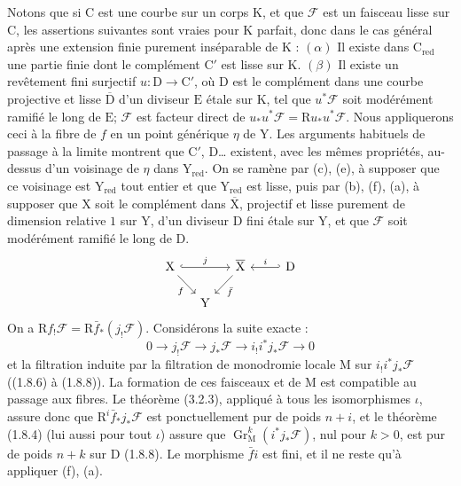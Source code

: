 \documentclass[11pt,leqno]{article}
\begin{document}
Notons que si \(\mathrm{C}\) est une courbe sur un corps \(\mathrm{K}\), et que \(\mathscr{F}\) est un faisceau lisse sur \(\mathrm{C}\), les assertions suivantes sont vraies pour \(\mathrm{K}\) parfait, donc dans le cas général après une extension finie purement inséparable de \(\mathrm{K}\) : \((\alpha)\) Il existe dans \(\mathrm{C}_{\mathrm{red}}\) une partie finie dont le complément \(\mathrm{C}'\) est lisse sur \(\mathrm{K}\). \((\beta)\) Il existe un revêtement fini surjectif \(u:\mathrm{D}\to\mathrm{C}'\), où \(\mathrm{D}\) est le complément dans une courbe projective et lisse \(\overline{\mathrm{D}}\) d’un diviseur \(\mathrm{E}\) étale sur \(\mathrm{K}\), tel que \(u^*\mathscr{F}\) soit modérément ramifié le long de \(\mathrm{E}\); \(\mathscr{F}\) est facteur direct de \(u_*u^*\mathscr{F}=\mathrm{R}u_*u^*\mathscr{F}\). Nous appliquerons ceci à la fibre de \(f\) en un point générique \(\eta\) de \(\mathrm{Y}\). Les arguments habituels de passage à la limite montrent que \(\mathrm{C}'\), \(\mathrm{D}\)\dots{} existent, avec les mêmes propriétés, au-dessus d’un voisinage de \(\eta\) dans \(\mathrm{Y}_{\mathrm{red}}\). On se ramène par (c), (e), à supposer que ce voisinage est \(\mathrm{Y}_{\mathrm{red}}\) tout entier et que \(\mathrm{Y}_{\mathrm{red}}\) est lisse, puis par (b), (f), (a), à supposer que \(\mathrm{X}\) soit le complément dans \(\overline{\mathrm{X}}\), projectif et lisse purement de dimension relative \(1\) sur \(\mathrm{Y}\), d’un diviseur \(\mathrm{D}\) fini étale sur \(\mathrm{Y}\), et que \(\mathscr{F}\) soit modérément ramifié le long de \(\mathrm{D}\).
\[
\begin{tikzcd}[ampersand replacement=\&,column sep=1.2em,row sep=1.5em]
\mathrm{X} \arrow[rr,hook,"j"] \arrow[dr,"f"']
\& \&
\overline{\mathrm{X}} \arrow[dl,"\bar f"]
\& \&
\mathrm{D} \arrow[ll,hook',"i"']
\\
\& \mathrm{Y} \& \& \&
\end{tikzcd}
\]
On a \(\mathrm{R}f_!\mathscr{F}=\mathrm{R}\bar{f}_*(j_!\mathscr{F})\). Considérons la suite exacte :
\[
0\to j_!\mathscr{F}\to j_*\mathscr{F}
\to i_!i^*j_*\mathscr{F}\to0
\]
et la filtration induite par la filtration de monodromie locale \(\mathrm{M}\) sur \(i_!i^*j_*\mathscr{F}\) ((1.8.6) à (1.8.8)). La formation de ces faisceaux et de \(\mathrm{M}\) est compatible au passage aux fibres. Le théorème (3.2.3), appliqué à tous les isomorphismes \(\iota\), assure donc que \(\mathrm{R}^i\bar{f}_*j_*\mathscr{F}\) est ponctuellement pur de poids \(n+i\), et le théorème (1.8.4) (lui aussi pour tout \(\iota\)) assure que \(\operatorname{Gr}_{\mathrm{M}}^k(i^*j_*\mathscr{F})\), nul pour \(k>0\), est pur de poids \(n+k\) sur \(\mathrm{D}\) (1.8.8). Le morphisme \(\bar{f}i\) est fini, et il ne reste qu’à appliquer (f), (a).
\end{document}

